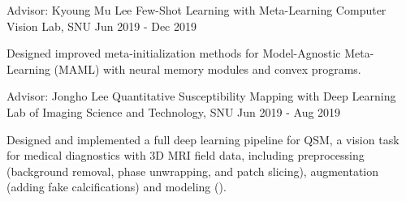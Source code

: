 \begin{cventries}
  \cventryexp
    {Advisor: Kyoung Mu Lee}
    {Few-Shot Learning with Meta-Learning}
    {Computer Vision Lab, SNU}
    {Jun 2019 - Dec 2019}
    {
      \begin{cvitems}
        \item {Designed improved meta-initialization methods for Model-Agnostic Meta-Learning (MAML) with neural memory modules and convex programs.}
      \end{cvitems}
    }
    
  \cventryexp
    {Advisor: Jongho Lee}
    {Quantitative Susceptibility Mapping with Deep Learning}
    {Lab of Imaging Science and Technology, SNU}
    {Jun 2019 - Aug 2019}
    {
      \begin{cvitems}
      \item {Designed and implemented a full deep learning pipeline for QSM, a vision task for medical diagnostics with 3D MRI field data, including preprocessing (background removal, phase unwrapping, and patch slicing), augmentation (adding fake calcifications) and modeling (\href{https://github.com/jaywonchung/CAD-QSMNet}{}).}
      \end{cvitems}
    }

\end{cventries}
